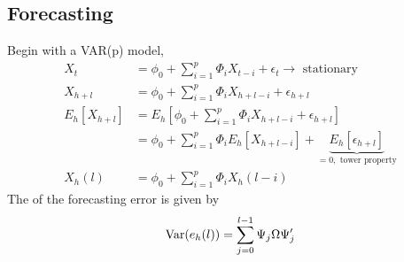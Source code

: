 \subsection{Forecasting}
Begin with a VAR(p) model,
\begin{align*}
    X_t & = \phi_0 + \sum_{i=1}^{p} \Phi_i X_{t-i} + \epsilon_t \to \text{ stationary}\\
    X_{h+l} & = \phi_0 + \sum_{i=1}^{p} \Phi_i X_{h+l-i} + \epsilon_{h+l}\\
    E_h[X_{h+l}] & = E_h\left[\phi_0 + \sum_{i=1}^{p} \Phi_i X_{h+l-i} + \epsilon_{h+l}\right]\\
    & = \phi_0 + \sum_{i=1}^{p} \Phi_i E_h[X_{h+l-i}] + \underbrace{E_h[\epsilon_{h+l}]}_{=0,\text{ tower property}}\\
    X_h(l) & = \phi_0 + \sum_{i=1}^{p} \Phi_i X_h(l-i)
\end{align*}
The  of the forecasting error is given by 
\begin{equation*}
    \operatorname{Var}(e_h(l)) = \sum_{j=0}^{l-1} \Psi_j\Omega\Psi'_j
\end{equation*}




